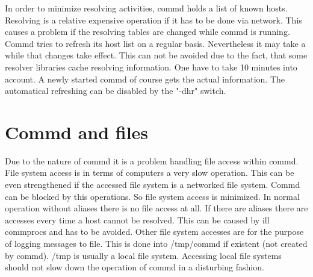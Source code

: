 In order to minimize resolving activities, commd holds a list of known hosts.
Resolving is a relative expensive operation if it has to be done via network.
This causes a problem if the resolving tables are changed while commd is
running. Commd tries to refresh its host list on a regular basis. 
Nevertheless it may take a while that changes take effect. This can not be
avoided due to the fact, that some resolver libraries cache resolving 
information. One have to take 10 minutes into account. A newly started
commd of course gets the actual information. The automatical refreshing
can be disabled by the "-dhr" switch.

\section{Commd and files}

Due to the nature of commd it is a problem handling file access within commd.
File system access is in terms of computers a very slow operation. This can
be even strengthened if the accessed file system is a networked file system.
Commd can be blocked by this operations. So file system access is minimized.
In normal operation without aliases there is no file access at all. If there
are aliases there are accesses every time a host cannot be resolved. This can
be caused by ill commprocs and has to be avoided. Other file system accesses
are for the purpose of logging messages to file. This is done into /tmp/commd
if existent (not created by commd). /tmp is usually a local file
system. Accessing local file systems should not slow down the operation
of commd in a disturbing fashion.


